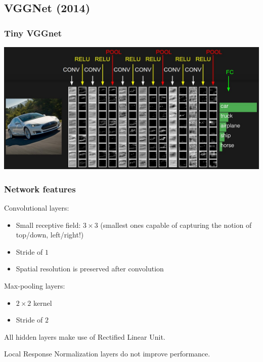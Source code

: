 \subsection{VGGNet (2014)}

\begin{frame}
	\frametitle{Tiny VGGnet}


		\bigskip

	\begin{center}
		\includegraphics[scale=0.25]{figs/convnet}
	\end{center}
\end{frame}

\begin{frame}
	\frametitle{Network features}

	Convolutional layers:
	\begin{itemize}
		\item Small receptive field: $3 \times 3$ (smallest ones capable of capturing the notion of top/down, left/right!)
		\item Stride of $1$
		\item Spatial resolution is preserved after convolution
	\end{itemize}

	\bigskip

	Max-pooling layers:
	\begin{itemize}
		\item $2 \times 2$ kernel
		\item Stride of $2$
	\end{itemize}

	\bigskip

	All hidden layers make use of Rectified Linear Unit.

	\bigskip

	Local Response Normalization layers do not improve performance.

\end{frame}

